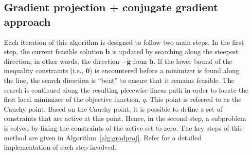 \documentclass[11pt]{article}
\newcommand{\0}{\phantom{0}}
\begin{document}


\subsection{Gradient projection + conjugate gradient approach}

Each iteration of this algorithm is designed to follow two main steps. In the first step, the current feasible solution $\mathring{\bm{b}}$ is updated by searching along the steepest direction; in other words, the direction $-\mathring{\bm{g}}$ from $\mathring{\bm{b}}$. If the lower bound of the inequality constraints (i.e., $\bm{0}$) is encountered before a minimizer is found along the line, the search direction is ``bent'' to ensure that it remains feasible. The search is continued along the resulting piecewise-linear path in order to locate the first local minimizer of the objective function, $q$. This point is referred to as the Cauchy point. Based on the Cauchy point, it is possible to define a set of constraints that are active at this point. Hence, in the second step, a subproblem is solved by fixing the constraints of the active set to zero. The key steps of this method are given in Algorithm~\ref{alg:gradproj}. Refer \citet{Nocedal2006} for a detailed implementation of each step involved.
\end{document}
